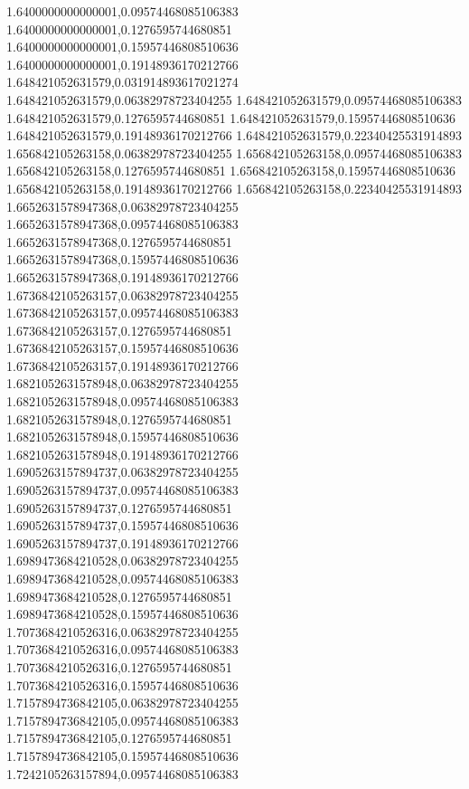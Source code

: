 1.6400000000000001,0.09574468085106383
1.6400000000000001,0.1276595744680851
1.6400000000000001,0.15957446808510636
1.6400000000000001,0.19148936170212766
1.648421052631579,0.031914893617021274
1.648421052631579,0.06382978723404255
1.648421052631579,0.09574468085106383
1.648421052631579,0.1276595744680851
1.648421052631579,0.15957446808510636
1.648421052631579,0.19148936170212766
1.648421052631579,0.22340425531914893
1.656842105263158,0.06382978723404255
1.656842105263158,0.09574468085106383
1.656842105263158,0.1276595744680851
1.656842105263158,0.15957446808510636
1.656842105263158,0.19148936170212766
1.656842105263158,0.22340425531914893
1.6652631578947368,0.06382978723404255
1.6652631578947368,0.09574468085106383
1.6652631578947368,0.1276595744680851
1.6652631578947368,0.15957446808510636
1.6652631578947368,0.19148936170212766
1.6736842105263157,0.06382978723404255
1.6736842105263157,0.09574468085106383
1.6736842105263157,0.1276595744680851
1.6736842105263157,0.15957446808510636
1.6736842105263157,0.19148936170212766
1.6821052631578948,0.06382978723404255
1.6821052631578948,0.09574468085106383
1.6821052631578948,0.1276595744680851
1.6821052631578948,0.15957446808510636
1.6821052631578948,0.19148936170212766
1.6905263157894737,0.06382978723404255
1.6905263157894737,0.09574468085106383
1.6905263157894737,0.1276595744680851
1.6905263157894737,0.15957446808510636
1.6905263157894737,0.19148936170212766
1.6989473684210528,0.06382978723404255
1.6989473684210528,0.09574468085106383
1.6989473684210528,0.1276595744680851
1.6989473684210528,0.15957446808510636
1.7073684210526316,0.06382978723404255
1.7073684210526316,0.09574468085106383
1.7073684210526316,0.1276595744680851
1.7073684210526316,0.15957446808510636
1.7157894736842105,0.06382978723404255
1.7157894736842105,0.09574468085106383
1.7157894736842105,0.1276595744680851
1.7157894736842105,0.15957446808510636
1.7242105263157894,0.09574468085106383

